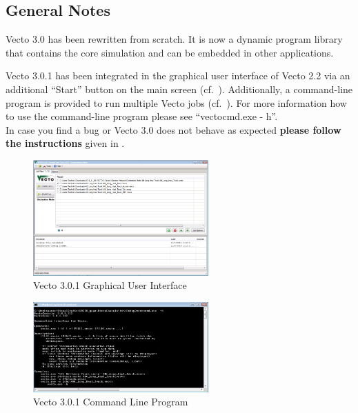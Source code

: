 \subsection{General Notes} %
\label{ssub:general_notes}

Vecto 3.0 has been rewritten from scratch. It is now a dynamic program library that contains the core simulation and can be embedded in other applications.


Vecto 3.0.1 has been integrated in the graphical user interface of Vecto 2.2 via an additional ``Start'' button on the main screen (cf.~). Additionally, a command-line program is provided to run multiple Vecto jobs (cf.~). For more information how to use the command-line program please see ``vectocmd.exe - h''.\\[-0.3em]

In case you find a bug or Vecto 3.0 does not behave as expected \textbf{please follow the instructions} given in .

\begin{figure}
	\centering
	\includegraphics[width=0.6\textwidth]{img/Vecto3_0_1_UI.png}
	\caption{Vecto 3.0.1 Graphical User Interface}
	\label{fig:Vecto3_GUI}
\end{figure}

\begin{figure}
	\centering
	\includegraphics[width=0.6\textwidth]{img/Vecto3_0_1_cmd.png}
	\caption{Vecto 3.0.1 Command Line Program}
	\label{fig:Vecto3_CMD}
\end{figure}

